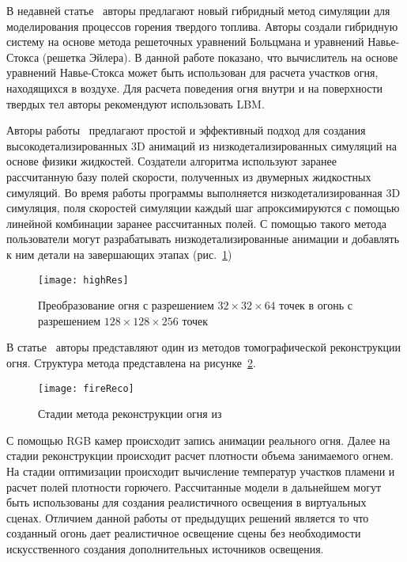 В недавней статье~\cite{Jo2019LatticeBoltzmannAE} авторы предлагают новый
гибридный метод симуляции для моделирования процессов горения твердого топлива.
Авторы создали гибридную систему на основе метода решеточных уравнений Больцмана
и уравнений Навье-Стокса (решетка Эйлера). В данной работе показано, что
вычислитель на основе уравнений Навье-Стокса может быть использован для расчета
участков огня, находящихся в воздухе. Для расчета поведения огня внутри и на
поверхности твердых тел авторы рекомендуют использовать LBM\@.

Авторы работы~\cite{Sato2012ADA} предлагают простой и эффективный подход для
создания высокодетализированных 3D анимаций из низкодетализированных симуляций
на основе физики жидкостей. Создатели алгоритма используют заранее рассчитанную
базу полей скорости, полученных из двумерных жидкостных симуляций. Во время
работы программы выполняется низкодетализированная 3D симуляция, поля скоростей
симуляции каждый шаг апроксимируются с помощью линейной комбинации заранее
рассчитанных полей. С помощью такого метода пользователи могут разрабатывать
низкодетализированные анимации и добавлять к ним детали на завершающих этапах
(рис.~\ref{fig:highRes})
\begin{figure}[htb]
	\centering
    \texttt{[image: highRes]}
    \caption{Преобразование огня с разрешением $32 \times 32 \times 64$ точек в
    огонь с разрешением $128 \times 128 \times 256$ точек}%
    \label{fig:highRes}
\end{figure}

В статье~\cite{MultiView} авторы представляют один из методов томографической
реконструкции огня. Структура метода представлена на
рисунке~\ref{fig:fireReco}.
\begin{figure}[htb]
	\centering
    \texttt{[image: fireReco]}
    \caption{Стадии метода реконструкции огня из~\cite{MultiView}}%
    \label{fig:fireReco}
\end{figure}
С помощью RGB камер происходит запись анимации реального огня. Далее на стадии
реконструкции происходит расчет плотности объема занимаемого огнем. На стадии
оптимизации происходит вычисление температур участков пламени и расчет полей
плотности горючего. Рассчитанные модели в дальнейшем могут быть использованы для
создания реалистичного освещения в виртуальных сценах. Отличием данной работы от
предыдущих решений является то что созданный огонь дает реалистичное освещение
сцены без необходимости искусственного создания дополнительных источников
освещения.

